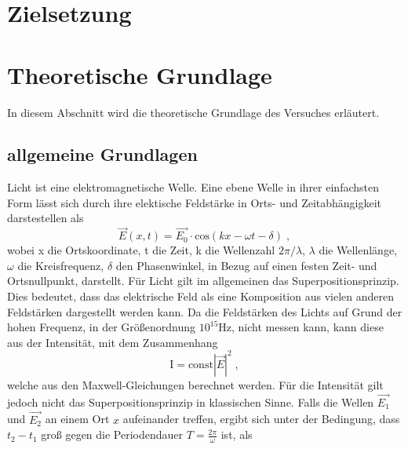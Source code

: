 \section{Zielsetzung}

\section{Theoretische Grundlage}
\noindent
In diesem Abschnitt wird die theoretische Grundlage des Versuches erläutert.  
\subsection{allgemeine Grundlagen}
Licht ist eine elektromagnetische Welle. Eine ebene Welle in ihrer einfachsten Form lässt sich durch ihre elektische Feldstärke in Orts- und Zeitabhängigkeit darstestellen als
\begin{equation}
    \vec{E}(x, t) = \vec{E_0} \cdot \text{cos}(kx - \omega t - \delta) \; , 
    \label{eqn:ansatz}
\end{equation}
\noindent
wobei x die Ortskoordinate, t die Zeit, k die Wellenzahl $2 \pi/\lambda$, $\lambda$ die Wellenlänge, $\omega$ die Kreisfrequenz, $\delta$ den Phasenwinkel, in Bezug auf einen festen Zeit- und Ortsnullpunkt, darstellt.
Für Licht gilt im allgemeinen das Superpositionsprinzip. Dies bedeutet, dass das elektrische Feld als eine Komposition aus vielen anderen Feldstärken dargestellt werden kann.
Da die Feldstärken des Lichts auf Grund der hohen Frequenz, in der Größenordnung $10^{15} \si{\hertz}$, nicht messen kann, kann diese aus der Intensität, mit dem Zusammenhang
\begin{equation*}
    \text{I} = \text{const} |\vec{E}|^2 \; ,
    \label{eqn:Int}
\end{equation*}
\noindent
welche aus den Maxwell-Gleichungen berechnet werden. Für die Intensität gilt jedoch nicht das Superpositionsprinzip in klassischen Sinne. Falls die Wellen $\vec{E_1}$ und $\vec{E_2}$ 
an einem Ort $x$  aufeinander treffen, ergibt sich unter der Bedingung, dass $t_2 - t_1$ groß gegen die Periodendauer $T = \frac{2 \pi}{\omega}$ ist, als

